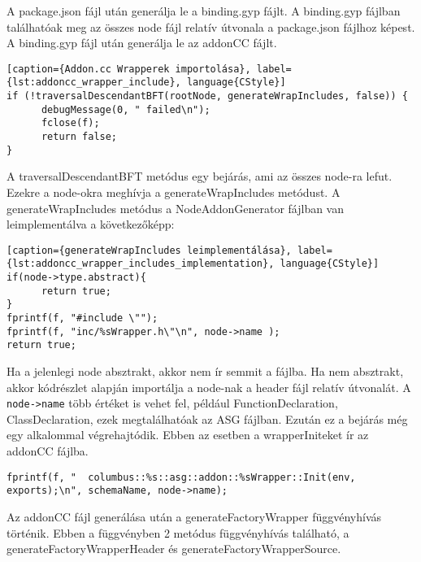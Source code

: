 \noindent

A package.json fájl után generálja le a binding.gyp fájlt.
A binding.gyp fájlban találhatóak meg az összes node fájl relatív útvonala a package.json fájlhoz képest.
A binding.gyp fájl után generálja le az addonCC fájlt.

\begin{lstlisting}[caption={Addon.cc Wrapperek importolása}, label={lst:addoncc_wrapper_include}, language{CStyle}]
if (!traversalDescendantBFT(rootNode, generateWrapIncludes, false)) {
      debugMessage(0, " failed\n");
      fclose(f);
      return false;
}
\end{lstlisting}

A traversalDescendantBFT metódus egy bejárás, ami az összes node-ra lefut. Ezekre a node-okra meghívja a generateWrapIncludes metódust.
A generateWrapIncludes metódus a NodeAddonGenerator fájlban van leimplementálva a következőképp:

\begin{lstlisting}[caption={generateWrapIncludes leimplementálása}, label={lst:addoncc_wrapper_includes_implementation}, language{CStyle}]
if(node->type.abstract){
      return true;
}
fprintf(f, "#include \"");
fprintf(f, "inc/%sWrapper.h\"\n", node->name );
return true;
\end{lstlisting}

Ha a jelenlegi node absztrakt, akkor nem ír semmit a fájlba.
Ha nem absztrakt, akkor  kódrészlet alapján importálja a node-nak a header fájl relatív útvonalát.
A \texttt{node->name} több értéket is vehet fel, például FunctionDeclaration, ClassDeclaration, ezek megtalálhatóak az ASG fájlban.
Ezután ez a bejárás még egy alkalommal végrehajtódik. Ebben az esetben a wrapperIniteket ír az addonCC fájlba.

\begin{lstlisting}[caption={generateWrapInit leimplementálása}, label={lst:addoncc_wrapper_inits_implementation}, language={CStyle}]
fprintf(f, "  columbus::%s::asg::addon::%sWrapper::Init(env, exports);\n", schemaName, node->name);
\end{lstlisting}

\noindent

Az addonCC fájl generálása után a generateFactoryWrapper függvényhívás történik.
Ebben a függvényben 2 metódus függvényhívás található, a generateFactoryWrapperHeader és generateFactoryWrapperSource.

\noindent

